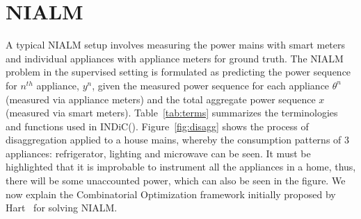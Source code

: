 \documentclass[conference]{IEEEtran}
\newcommand{\figref}[1]{Figure~\ref{#1}}
\newcommand{\tabref}[1]{Table~\ref{#1}}
\newcommand{\indicns}{INDiC}
\begin{document}



\section{NIALM}
\noindent A typical NIALM setup involves measuring the power mains with smart meters and individual appliances with appliance meters for ground truth. The NIALM problem in the supervised setting is formulated as predicting the power sequence for $n^{th}$ appliance, $y^n$, given the measured power sequence for each appliance $\theta^n$ (measured via appliance meters) and the total aggregate power sequence $x$ (measured via smart meters). \tabref{tab:terms} summarizes the terminologies and functions used in \indicns (\cite{redd,parson2012_aaai,hart}). \figref{fig:disagg} shows the process of disaggregation applied to a house mains, whereby the consumption patterns of 3 appliances: refrigerator, lighting and microwave can be seen. It must be highlighted that it is improbable to instrument all the appliances in a home, thus, there will be some unaccounted power, which can also be seen in the figure. We now explain the Combinatorial Optimization framework initially proposed by Hart~\cite{hart} for solving NIALM.
\end{document}
